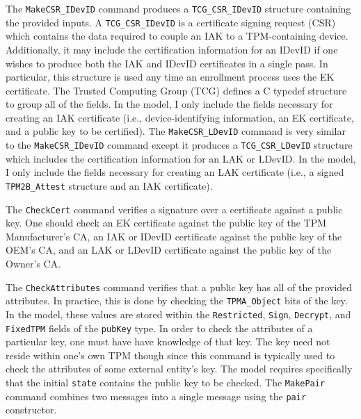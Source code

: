 The \verb|MakeCSR_IDevID| command produces a \verb|TCG_CSR_IDevID| structure containing the provided inputs. 
 A \verb|TCG_CSR_IDevID| is a certificate signing request (CSR) which contains the data required to couple an IAK to a TPM-containing device. Additionally, it may include the certification information for an IDevID if one wishes to produce both the IAK and IDevID certificates in a single pass. In particular, this structure is used any time an enrollment process uses the EK certificate. The Trusted Computing Group (TCG) defines a C typedef structure to group all of the fields. In the model, I only include the fields necessary for creating an IAK certificate (i.e., device-identifying information, an EK certificate, and a public key to be certified). The \verb|MakeCSR_LDevID| command is very similar to the \verb|MakeCSR_IDevID| command except it produces a \verb|TCG_CSR_LDevID| structure which includes the certification information for an LAK or LDevID. In the model, I only include the fields necessary for creating an LAK certificate (i.e., a signed \verb|TPM2B_Attest| structure and an IAK certificate).

The \verb|CheckCert| command verifies a signature over a certificate against a public key. One should check an EK certificate against the public key of the TPM Manufacturer's CA, an IAK or IDevID certificate against the public key of the OEM's CA, and an LAK or LDevID certificate against the public key of the Owner's CA.

The \verb|CheckAttributes| command verifies that a public key has all of the provided attributes. In practice, this is done by checking the \verb|TPMA_Object|  bits of the key. In the model, these values are stored within the \verb|Restricted|, \verb|Sign|, \verb|Decrypt|, and \verb|FixedTPM| fields of the \verb|pubKey| type. In order to check the attributes of a particular key, one must have have knowledge of that key. The key need not reside within one's own TPM though since this command is typically used to check the attributes of some external entity's key. The model requires specifically that the initial \verb|state| contains the public key to be checked. The \verb|MakePair| command combines two messages into a single message using the \verb|pair| constructor.









